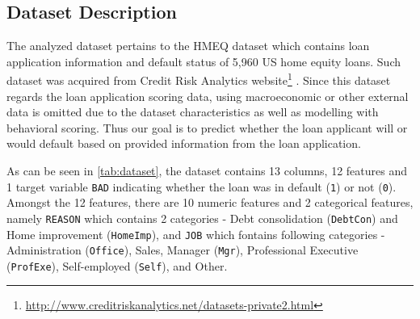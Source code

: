 \subsection{Dataset Description}
The analyzed dataset pertains to the HMEQ dataset which contains loan application information and default status of 5,960 US home equity loans. Such dataset was acquired from Credit Risk Analytics website\footnote{\url{http://www.creditriskanalytics.net/datasets-private2.html}} \citep{baesens2016credit}. Since this dataset regards the loan application scoring data, using macroeconomic or other external data is omitted due to the dataset characteristics as well as modelling with behavioral scoring.
Thus our goal is to predict whether the loan applicant will or would default based on provided information from the loan application.

As can be seen in \autoref{tab:dataset}, the dataset contains 13 columns, 12 features and 1 target variable \texttt{BAD} indicating whether the loan was in default (\texttt{1}) or not (\texttt{0}). 
Amongst the 12 features, there are 10 numeric features and 2 categorical features, namely \texttt{REASON} which contains 2 categories - Debt consolidation (\texttt{DebtCon}) and Home improvement (\texttt{HomeImp}), and \texttt{JOB} which fontains following categories - Administration (\texttt{Office}), Sales, Manager (\texttt{Mgr}), Professional Executive (\texttt{ProfExe}), Self-employed (\texttt{Self}), and Other.



